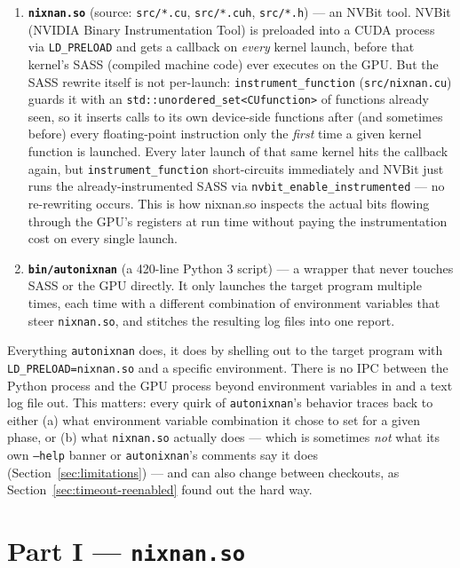 \documentclass[11pt]{article}
\begin{document}
\begin{enumerate}
\item \textbf{\texttt{nixnan.so}} (source: \texttt{src/*.cu}, \texttt{src/*.cuh},
  \texttt{src/*.h}) --- an NVBit tool. NVBit (NVIDIA Binary Instrumentation
  Tool) is preloaded into a CUDA process via \texttt{LD\_PRELOAD} and gets
  a callback on \emph{every} kernel launch, before that kernel's SASS
  (compiled machine code) ever executes on the GPU. But the SASS rewrite
  itself is not per-launch: \texttt{instrument\_function} (\texttt{src/nixnan.cu})
  guards it with an \texttt{std::unordered\_set<CUfunction>} of functions
  already seen, so it inserts calls to its own device-side functions after
  (and sometimes before) every floating-point instruction only the
  \emph{first} time a given kernel function is launched. Every later
  launch of that same kernel hits the callback again, but
  \texttt{instrument\_function} short-circuits immediately and NVBit just
  runs the already-instrumented SASS via \texttt{nvbit\_enable\_instrumented}
  --- no re-rewriting occurs. This is how nixnan.so inspects the actual
  bits flowing through the GPU's registers at run time without paying the
  instrumentation cost on every single launch.
\item \textbf{\texttt{bin/autonixnan}} (a 420-line Python 3 script) --- a
  wrapper that never touches SASS or the GPU directly. It only launches
  the target program multiple times, each time with a different
  combination of environment variables that steer \texttt{nixnan.so},
  and stitches the resulting log files into one report.
\end{enumerate}

Everything \texttt{autonixnan} does, it does by shelling out to the
target program with \texttt{LD\_PRELOAD=nixnan.so} and a specific
environment. There is no IPC between the Python process and the GPU
process beyond environment variables in and a text log file out. This
matters: every quirk of \texttt{autonixnan}'s behavior traces back to
either (a) what environment variable combination it chose to set for a
given phase, or (b) what \texttt{nixnan.so} actually does --- which is
sometimes \emph{not} what its own \texttt{--help} banner or
\texttt{autonixnan}'s comments say it does (Section~\ref{sec:limitations}) ---
and can also change between checkouts, as Section~\ref{sec:timeout-reenabled}
found out the hard way.

\section{Part I --- \texttt{nixnan.so}}
\end{document}
